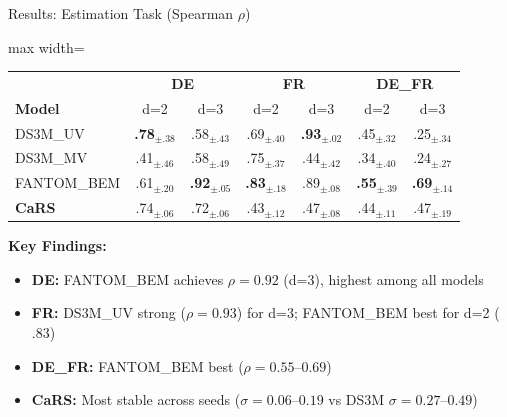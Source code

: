 \documentclass[aspectratio=169]{beamer}
\begin{document}
\begin{frame}{Results: Estimation Task (Spearman $\rho$)}
\begin{table}
\centering
\small
\begin{adjustbox}{max width=\textwidth}
\begin{tabular}{l|cc|cc|cc}
\toprule
& \multicolumn{2}{c|}{\textbf{DE}} & \multicolumn{2}{c|}{\textbf{FR}} & \multicolumn{2}{c}{\textbf{DE\_FR}} \\
\textbf{Model} & d=2 & d=3 & d=2 & d=3 & d=2 & d=3 \\
\midrule
DS3M\_UV & \textbf{.78}$_{\pm.38}$ & .58$_{\pm.43}$ & .69$_{\pm.40}$ & \textbf{.93}$_{\pm.02}$ & .45$_{\pm.32}$ & .25$_{\pm.34}$ \\
DS3M\_MV & .41$_{\pm.46}$ & .58$_{\pm.49}$ & .75$_{\pm.37}$ & .44$_{\pm.42}$ & .34$_{\pm.40}$ & .24$_{\pm.27}$ \\
FANTOM\_BEM & .61$_{\pm.20}$ & \textbf{.92}$_{\pm.05}$ & \textbf{.83}$_{\pm.18}$ & .89$_{\pm.08}$ & \textbf{.55}$_{\pm.39}$ & \textbf{.69}$_{\pm.14}$ \\
\midrule
\textbf{CaRS} & .74$_{\pm.06}$ & .72$_{\pm.06}$ & .43$_{\pm.12}$ & .47$_{\pm.08}$ & .44$_{\pm.11}$ & .47$_{\pm.19}$ \\
\bottomrule
\end{tabular}
\end{adjustbox}
\end{table}


\vspace{0.2cm}
\textbf{Key Findings:}
\begin{itemize}
    \item \textbf{DE:} FANTOM\_BEM achieves $\rho = 0.92$ (d=3), highest among all models
    \item \textbf{FR:} DS3M\_UV strong ($\rho = 0.93$) for d=3; FANTOM\_BEM best for d=2 ($.83$)
    \item \textbf{DE\_FR:} FANTOM\_BEM best ($\rho = 0.55$--$0.69$)
    \item \textbf{CaRS:} Most stable across seeds ($\sigma = 0.06$--$0.19$ vs DS3M $\sigma = 0.27$--$0.49$)
\end{itemize}
\end{frame}
\end{document}
